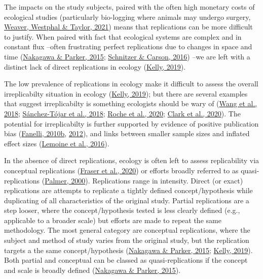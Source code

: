 \documentclass[10pt,a4paper]{article}
\begin{document}
The impacts on the study subjects, paired with the often high monetary costs of ecological studies (particularly bio-logging where animals may undergo surgery, \protect\hyperlink{ref-weaver_technology_2021}{Weaver, Westphal \& Taylor, 2021}) means that replications can be more difficult to justify.
When paired with fact that ecological systems are complex and in constant flux --often frustrating perfect replications due to changes in space and time (\protect\hyperlink{ref-nakagawa_replicating_2015}{Nakagawa \& Parker, 2015}; \protect\hyperlink{ref-schnitzer_would_2016}{Schnitzer \& Carson, 2016}) --we are left with a distinct lack of direct replications in ecology (\protect\hyperlink{ref-kelly_rate_2019}{Kelly, 2019}).

The low prevalence of replications in ecology make it difficult to assess the overall irreplicabilty situation in ecology (\protect\hyperlink{ref-kelly_rate_2019}{Kelly, 2019}); but there are several examples that suggest irreplicabilty is something ecologists should be wary of (\protect\hyperlink{ref-wang_irreproducible_2018}{Wang et al., 2018}; \protect\hyperlink{ref-sanchez-tojar_meta-analysis_2018}{Sánchez-Tójar et al., 2018}; \protect\hyperlink{ref-roche_behavioural_2020}{Roche et al., 2020}; \protect\hyperlink{ref-clark_ocean_2020}{Clark et al., 2020}).
The potential for irreplicabilty is further supported by evidence of positive publication bias (\protect\hyperlink{ref-fanelli_positive_2010}{Fanelli, 2010b}, \protect\hyperlink{ref-fanelli_negative_2012}{2012}), and links between smaller sample sizes and inflated effect sizes (\protect\hyperlink{ref-lemoine_underappreciated_2016}{Lemoine et al., 2016}).

In the absence of direct replications, ecology is often left to assess replicability via conceptual replications (\protect\hyperlink{ref-fraser_role_2020}{Fraser et al., 2020}) or efforts broadly referred to as quasi-replications (\protect\hyperlink{ref-palmer_quasi-replication_2000}{Palmer, 2000}).
Replications range in intensity. Direct (or exact) replications are attempts to replicate a tightly defined concept/hypothesis while duplicating of all characteristics of the original study.
Partial replications are a step looser, where the concept/hypothesis tested is less clearly defined (e.g., applicable to a broader scale) but efforts are made to repeat the same methodology.
The most general category are conceptual replications, where the subject and method of study varies from the original study, but the replication targets a the same concept/hypothesis (\protect\hyperlink{ref-nakagawa_replicating_2015}{Nakagawa \& Parker, 2015}; \protect\hyperlink{ref-kelly_rate_2019}{Kelly, 2019}).
Both partial and conceptual can be classed as quasi-replications if the concept and scale is broadly defined (\protect\hyperlink{ref-nakagawa_replicating_2015}{Nakagawa \& Parker, 2015}).
\end{document}
